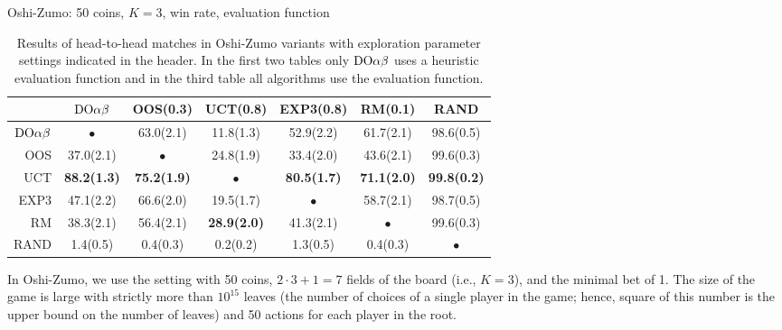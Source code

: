 \begin{table}[t!]
\begin{scriptsize}
Oshi-Zumo: 50 coins, $K=3$, win rate, evaluation function
\begin{tabular}{|r|cccccc|}\hline
&$\textrm{DO}\alpha\beta$&OOS(0.3)&UCT(0.8)&EXP3(0.8)&RM(0.1)&RAND\\\hline
$\textrm{DO}\alpha\beta$&$\bullet$&63.0(2.1)&11.8(1.3)&52.9(2.2)&61.7(2.1)&98.6(0.5)\\
OOS&37.0(2.1)&$\bullet$&24.8(1.9)&33.4(2.0)&43.6(2.1)&99.6(0.3)\\
UCT&\textbf{88.2(1.3)}&\textbf{75.2(1.9)}&$\bullet$&\textbf{80.5(1.7)}&\textbf{71.1(2.0)}&\textbf{99.8(0.2)}\\
EXP3&47.1(2.2)&66.6(2.0)&19.5(1.7)&$\bullet$&58.7(2.1)&98.7(0.5)\\
RM&38.3(2.1)&56.4(2.1)&\textbf{28.9(2.0)}&41.3(2.1)&$\bullet$&99.6(0.3)\\
RAND&1.4(0.5)&0.4(0.3)&0.2(0.2)&1.3(0.5)&0.4(0.3)&$\bullet$\\
\hline
\end{tabular}
\end{scriptsize}
\caption{Results of head-to-head matches in Oshi-Zumo variants with exploration parameter settings indicated in the header. In the first two tables only $\textrm{DO}\alpha\beta$ uses a heuristic evaluation function and in the third table all algorithms use the evaluation function.}\label{fig:matches:oz}
\end{table}

In Oshi-Zumo, we use the setting with 50 coins, $2\cdot 3 + 1 = 7$ fields of the board (i.e., $K=3$), and the minimal bet of 1.
The size of the game is large with strictly more than $10^{15}$ leaves (the number of choices of a single player in the game; hence, square of this number is the upper bound on the number of leaves) and 50 actions for each player in the root.



